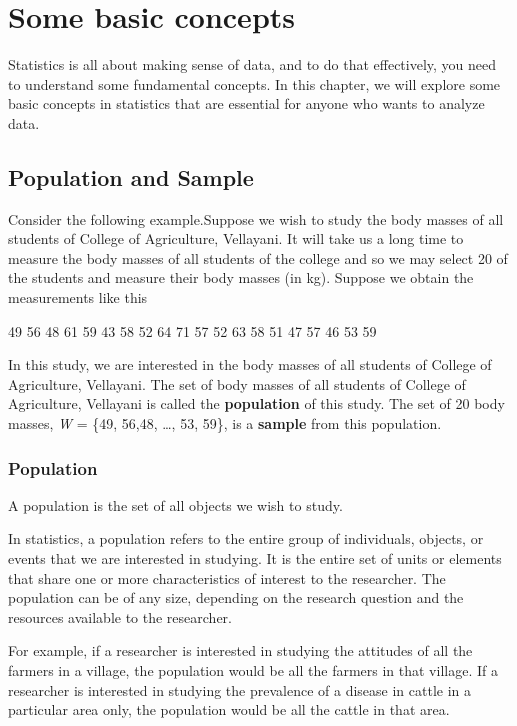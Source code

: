 \documentclass[
]{book}
\begin{document}
\hypertarget{some-basic-concepts}{%
\chapter{Some basic concepts}\label{some-basic-concepts}}

Statistics is all about making sense of data, and to do that effectively, you need to understand some fundamental concepts. In this chapter, we will explore some basic concepts in statistics that are essential for anyone who wants to analyze data.

\hypertarget{population-and-sample}{%
\section{Population and Sample}\label{population-and-sample}}

Consider the following example.Suppose we wish to study the body masses
of all students of College of Agriculture, Vellayani. It will take us a
long time to measure the body masses of all students of the college and
so we may select 20 of the students and measure their body masses (in
kg). Suppose we obtain the measurements like this

49 56 48 61 59 43 58 52 64 71 57 52 63 58 51 47 57 46 53 59

In this study, we are interested in the body masses of all students of
College of Agriculture, Vellayani. The set of body masses of all
students of College of Agriculture, Vellayani is called the
\textbf{population} of this study. The set of 20 body masses, \emph{W} = \{49,
56,48, \ldots, 53, 59\}, is a \textbf{sample} from this population.

\hypertarget{population}{%
\subsection{Population}\label{population}}

A population is the set of all objects we wish to study.

In statistics, a population refers to the entire group of individuals, objects, or events that we are interested in studying. It is the entire set of units or elements that share one or more characteristics of interest to the researcher. The population can be of any size, depending on the research question and the resources available to the researcher.

For example, if a researcher is interested in studying the attitudes of all the farmers in a village, the population would be all the farmers in that village. If a researcher is interested in studying the prevalence of a disease in cattle in a particular area only, the population would be all the cattle in that area.
\end{document}
